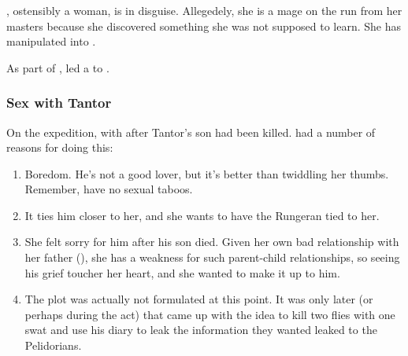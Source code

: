 \subsubsection{\Takestsha}
\index{\Takestsha}
\Takestsha, ostensibly a \human{} woman, is \Nzessuacrith{} in disguise. Allegedely, she is a mage on the run from her masters because she discovered something she was not supposed to learn. She has manipulated  into . 

As part of , \Takestsha led a  to .





\subsubsection{Sex with \Jirad Tantor}
On the \EreshKal expedition, \Takestsha {} with  after Tantor's son had been killed. 
\Nzessuacrith{} had a number of reasons for doing this: 

\begin{enumerate}
  \item 
    Boredom. 
    He's not a good lover, but it's better than twiddling her thumbs. 
    Remember, \dragons{} have no sexual taboos. 
  \item 
    It ties him closer to her, and she wants to have the Rungeran \ishrah{} tied to her. 
  \item
    She felt sorry for him after his son died. 
    Given her own bad relationship with her father (\Ishnaruchaefir), she has a weakness for such parent-child relationships, so seeing his grief toucher her heart, and she wanted to make it up to him. 
  \item
    The  plot was actually not formulated at this point. 
    It was only later (or perhaps during the act) that \Nzessuacrith{} came up with the idea to kill two flies with one swat and use his diary to leak the information they wanted leaked to the Pelidorians. 
\end{enumerate}









